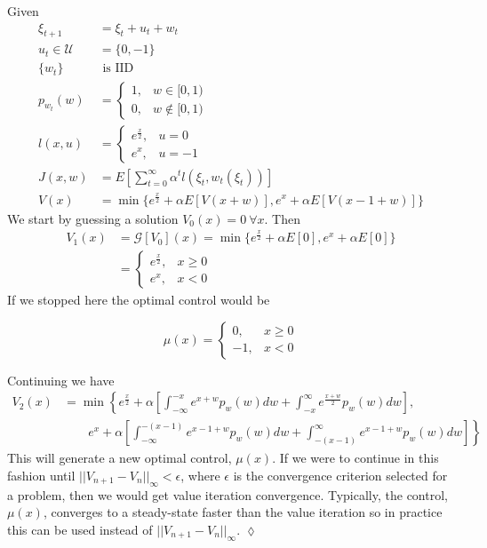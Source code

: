 \begin{example}
Given
\begin{align*}
\xi_{t+1} &= \xi_t+u_t+w_t \\
u_t\in\mathcal{U} &= \{0,-1\} \\
\{w_t\} &\text{~is~IID} \\
p_{w_t}(w) &= \begin{cases} 1, & w\in[0,1) \\ 0, & w\notin[0,1) \end{cases} \\%
l(x,u) &= \begin{cases} e^{\frac{x}{2}}, & u=0 \\ e^x, & u=-1 \end{cases} \\
J(x,w) &= E\left[\sum_{t=0}^\infty \alpha^t l(\xi_t,w_t(\xi_t))\right] \\
V(x) &= \min\{e^{\frac{x}{2}} + \alpha E[V(x+w)], e^x + \alpha E[V(x-1+w)]\}
\end{align*}
We start by guessing a solution $V_0(x)=0~\forall x$.
Then
\begin{align*}
V_1(x) &= \mathcal{G}[V_0](x) = \min\{e^{\frac{x}{2}}+\alpha E[0], e^x + \alpha E[0]\} \\
&= \begin{cases} e^{\frac{x}{2}}, & x\geq0 \\ e^x, & x<0 \end{cases}
\end{align*}
If we stopped here the optimal control would be

\begin{equation*}
\mu(x) = \begin{cases} 0, & x\geq0 \\ -1, & x<0 \end{cases}
\end{equation*}

Continuing we have
\begin{align*}
V_2(x) &= \min\left\lbrace e^{\frac{x}{2}} + \alpha\left[\int_{-\infty}^{-x} e^{x+w}p_w(w)dw + \int_{-x}^\infty e^{\frac{x+w}{2}}p_w(w)dw\right], \right. \\
&\left.\qquad e^x+\alpha\left[\int_{-\infty}^{-(x-1)}e^{x-1+w}p_w(w)dw + \int_{-(x-1)}^\infty e^{x-1+w}p_w(w)dw\right]\right\rbrace
\end{align*}
This will generate a new optimal control, $\mu(x)$.
If we were to continue in this fashion until $||V_{n+1}-V_n||_\infty<\epsilon$, where $\epsilon$ is the convergence criterion selected for a problem, then we would get value iteration convergence.
Typically, the control, $\mu(x)$, converges to a steady-state faster than the value iteration so in practice this can be used instead of $||V_{n+1}-V_n||_\infty$.
$\lozenge$
\end{example}

